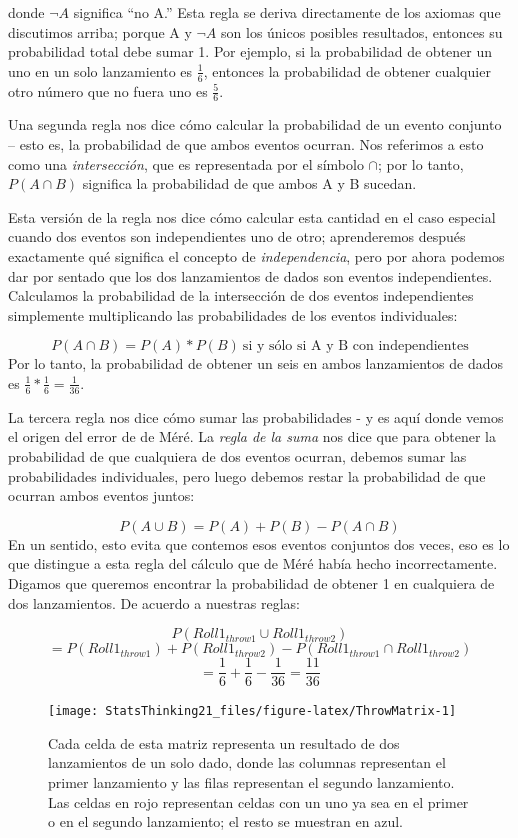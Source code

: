 \documentclass[
  12pt,
]{book}
\begin{document}
donde \(\neg A\) significa ``no A.'' Esta regla se deriva directamente de los axiomas que discutimos arriba; porque A y \(\neg A\) son los únicos posibles resultados, entonces su probabilidad total debe sumar 1. Por ejemplo, si la probabilidad de obtener un uno en un solo lanzamiento es \(\frac{1}{6}\), entonces la probabilidad de obtener cualquier otro número que no fuera uno es \(\frac{5}{6}\).

Una segunda regla nos dice cómo calcular la probabilidad de un evento conjunto -- esto es, la probabilidad de que ambos eventos ocurran. Nos referimos a esto como una \emph{intersección}, que es representada por el símbolo \(\cap\); por lo tanto, \(P(A \cap B)\) significa la probabilidad de que ambos A y B sucedan.

Esta versión de la regla nos dice cómo calcular esta cantidad en el caso especial cuando dos eventos son independientes uno de otro; aprenderemos después exactamente qué significa el concepto de \emph{independencia}, pero por ahora podemos dar por sentado que los dos lanzamientos de dados son eventos independientes. Calculamos la probabilidad de la intersección de dos eventos independientes simplemente multiplicando las probabilidades de los eventos individuales:

\[
P(A \cap B) = P(A) * P(B)\ \text{si y sólo si A y B con independientes}
\]
Por lo tanto, la probabilidad de obtener un seis en ambos lanzamientos de dados es \(\frac{1}{6}*\frac{1}{6}=\frac{1}{36}\).

La tercera regla nos dice cómo sumar las probabilidades - y es aquí donde vemos el origen del error de de Méré. La \emph{regla de la suma} nos dice que para obtener la probabilidad de que cualquiera de dos eventos ocurran, debemos sumar las probabilidades individuales, pero luego debemos restar la probabilidad de que ocurran ambos eventos juntos:

\[
P(A \cup B) = P(A) + P(B) - P(A \cap B)
\]
En un sentido, esto evita que contemos esos eventos conjuntos dos veces, eso es lo que distingue a esta regla del cálculo que de Méré había hecho incorrectamente. Digamos que queremos encontrar la probabilidad de obtener 1 en cualquiera de dos lanzamientos. De acuerdo a nuestras reglas:

\[
P(Roll1_{throw1} \cup Roll1_{throw2}) 
\]
\[
= P(Roll1_{throw1}) + P(Roll1_{throw2}) - P(Roll1_{throw1} \cap Roll1_{throw2}) 
\]
\[
= \frac{1}{6} + \frac{1}{6} - \frac{1}{36} = \frac{11}{36}
\]

\begin{figure}
\texttt{[image: StatsThinking21\_files/figure-latex/ThrowMatrix-1]} \caption{Cada celda de esta matriz representa un resultado de dos lanzamientos de un solo dado, donde las columnas representan el primer lanzamiento y las filas representan el segundo lanzamiento. Las celdas en rojo representan celdas con un uno ya sea en el primer o en el segundo lanzamiento; el resto se muestran en azul. }\label{fig:ThrowMatrix}
\end{figure}
\end{document}
